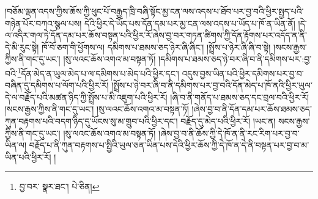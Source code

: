 །བཅོམ་ལྡན་འདས་ཀྱིས་ཆོས་ཀྱི་ཕུང་པོ་བརྒྱད་ཁྲི་བཞི་སྟོང་མྱ་ངན་ལས་འདས་པ་ཐོབ་པར་བྱ་བའི་ཕྱིར་སྤྱད་པའི་གཉེན་པོར་བཀའ་སྩལ་པས། དེའི་ཕྱིར་དེ་ཡོད་པས་དོན་དམ་པར་མྱ་ངན་ལས་འདས་པ་ཡོད་པ་ཁོ་ན་ཡིན་ནོ། །དེ་ལ་འདིར་གལ་ཏེ་དོན་དམ་པར་ཆོས་བསྟན་པའི་ཕྱིར་རོ་ཞེས་བྱ་བར་གཏན་ཚིགས་ཀྱི་དོན་རྟོགས་པར་འདོད་ན་ནི་དེ་མི་རུང་སྟེ། ཁོ་བོ་ཅག་གི་ཕྱོགས་ལ། དམིགས་པ་ཐམས་ཅད་ཉེར་ཞི་ཞིང་། །སྤྲོས་པ་ཉེར་ཞི་ཞི་བ་སྟེ། །སངས་རྒྱས་ཀྱིས་ནི་གང་དུ་ཡང་། །སུ་ལའང་ཆོས་འགའ་མ་བསྟན་ཏོ། །དམིགས་པ་ཐམས་ཅད་ཉེ་བར་ཞི་བ་ནི་དམིགས་པར་:བྱ་བའི་\footnote{བྱ་བར་  སྣར་ཐང་།  པེ་ཅིན། }དོན་མེད་ན་ཡུལ་མེད་པ་ལ་དམིགས་པ་མེད་པའི་ཕྱིར་དང་། འདུས་བྱས་ཡིན་པའི་ཕྱིར་དམིགས་པར་བྱ་བ་བཞིན་དུ་དམིགས་པ་ལོག་པའི་ཕྱིར་རོ། །སྤྲོས་པ་ཉེ་བར་ཞི་བ་ནི་དམིགས་པར་བྱ་བའི་དོན་མེད་པ་ཁོ་ནའི་ཕྱིར་ཡུལ་དེ་ལ་བརྗོད་པའི་མཚན་ཉིད་ཀྱི་སྤྲོས་པ་མི་འཇུག་པའི་ཕྱིར་རོ། །ཞི་བ་ནི་གནོད་པ་ཐམས་ཅད་དང་བྲལ་བའི་ཕྱིར་རོ། །སངས་རྒྱས་ཀྱིས་ནི་གང་དུ་ཡང་། །སུ་ལའང་ཆོས་འགའ་མ་བསྟན་ཏོ། །ཞེས་བྱ་བ་ནི་དོན་དམ་པར་ཆོས་ཐམས་ཅད་ཀུན་བརྟགས་པའི་བདག་ཉིད་དུ་ཡོངས་སུ་མ་གྲུབ་པའི་ཕྱིར་དང་། བརྗོད་དུ་མེད་པའི་ཕྱིར་རོ། །ཡང་ན། སངས་རྒྱས་ཀྱིས་ནི་གང་དུ་ཡང་། །སུ་ལའང་ཆོས་འགའ་མ་བསྟན་ཏོ། །ཞེས་བྱ་བ་ནི་ཆོས་ཀྱི་དེ་ཁོ་ན་ནི་རང་རིག་པར་བྱ་བ་ཡིན་ལ། བརྗོད་པ་ནི་ཀུན་བརྟགས་པ་སྤྱིའི་ཡུལ་ཅན་ཡིན་པས་དེའི་ཕྱིར་ཆོས་ཀྱི་དེ་ཁོ་ན་དེ་ནི་བསྟན་པར་བྱ་བ་མ་ཡིན་པའི་ཕྱིར་རོ། །
